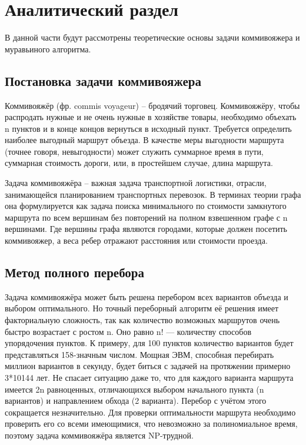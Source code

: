 \chapter{ Аналитический раздел}
\label{cha:analytical}
    В данной части будут рассмотрены теоретические 
    основы задачи коммивояжера и муравьиного алгоритма. 
	
    \section{Постановка задачи коммивояжера} 
        Коммивояжёр (фр. commis voyageur) -- бродячий торговец.
        Коммивояжёру, чтобы распродать нужные и не очень нужные в хозяйстве товары,
        необходимо объехать n пунктов и в конце концов вернуться в исходный пункт.
        Требуется определить наиболее выгодный маршрут объезда. 
        В качестве меры выгодности маршрута (точнее говоря, невыгодности)
        может служить суммарное время в пути, суммарная стоимость дороги,
        или, в простейшем случае, длина маршрута.
        
        Задача коммивояжёра -- важная задача транспортной логистики,
        отрасли, занимающейся планированием транспортных перевозок.
        В терминах теории графа она формулируется как задача
        поиска минимального по стоимости замкнутого маршрута
        по всем вершинам без повторений на полном взвешенном 
        графе с n вершинами. 
        Где вершины графа являются городами, которые должен
        посетить коммивояжер, а веса ребер отражают расстояния
        или стоимости проезда. 
        
    \section{Метод полного перебора}
        Задача коммивояжёра может быть решена перебором всех вариантов объезда и выбором оптимального.
        Но точный переборный алгоритм её решения имеет факториальную сложность, так как
        количество возможных маршрутов очень быстро возрастает с ростом n. 
        Оно равно n! — количеству способов упорядочения пунктов. 
        К примеру, для 100 пунктов количество вариантов будет представляться 158-значным числом.
        Мощная ЭВМ, способная перебирать миллион вариантов в секунду, 
        будет биться с задачей на протяжении примерно 3*10144 лет.
        Не спасает ситуацию даже то, что для каждого варианта маршрута имеется 2n равноценных,
        отличающихся выбором начального пункта (n вариантов) и направлением обхода (2 варианта).
        Перебор с учётом этого сокращается незначительно. 
        Для проверки оптимальности маршрута необходимо проверить 
        его со всеми имеющимися, что невозможно за полиномиальное время,
        поэтому задача коммивояжёра является NP-трудной.

